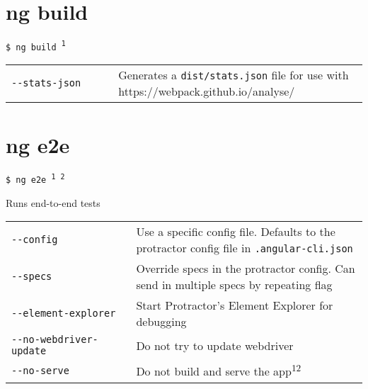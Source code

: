 \documentclass[8pt]{extarticle} %
\begin{document}
\begin{multicols}{3}
  \vspace{0.6ex}

\section*{ng build}

  \vspace{1ex}
  {\tt \$ ng build \textsuperscript{1} \itt{[options...]}}

  \vspace{0.6ex}

  {\small }

  \vspace{0.6ex}

  \begin{tabular}{L{0.30\linewidth} L{0.70\linewidth}}
    \tt -{}-stats-json & \small Generates a {\tt dist/stats.json} file for use with https://webpack.github.io/analyse/
  \end{tabular}

\section*{ng e2e}

  \vspace{1ex}
  {\tt \$ ng e2e {\small {}\textsuperscript{1} \textsuperscript{2}} \itt{[options...]}}

  \vspace{0.6ex}

  {\small Runs end-to-end tests}

  \vspace{0.6ex}

  \begin{tabular}{L{0.35\linewidth} L{0.65\linewidth}}
    \tt -{}-config  & \small Use a specific config file. Defaults to the protractor config file in {\tt .angular-cli.json} \\
    \tt -{}-specs  & \small Override specs in the protractor config. Can send in multiple specs by repeating flag \\
    \tt -{}-element-explorer & \small Start Protractor's Element Explorer for debugging \\
    \tt -{}-no-webdriver-update & \small Do not try to update webdriver \\
    \tt -{}-no-serve & \small Do not build and serve the app\textsuperscript{1}\textsuperscript{2} \\
  \end{tabular}


\end{multicols}
\end{document}
